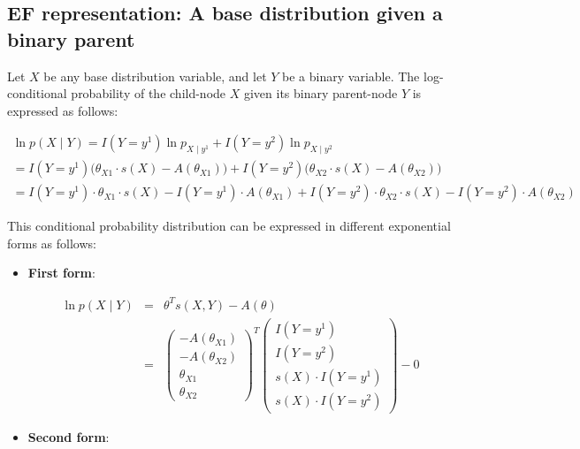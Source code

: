 \documentclass[11pt, oneside]{article}   	%
\numberwithin{figure}{section}
\numberwithin{equation}{section}
\numberwithin{table}{section}
\theoremstyle{definition}
\begin{document}
\begin{appendices}
\section{EF representation: A base distribution given a binary parent}

Let $X$ be any base distribution variable, and let $Y$ be a binary variable. The log-conditional probability of the child-node $X$ given its binary parent-node $Y$ is expressed as follows:

\begin{eqnarray*}
\ln p(X \mid Y) =  I(Y= y^1) \ln p_{X \mid y^1} + I(Y= y^2) \ln p_{X \mid y^2} ~~~~~~~~~~~~~~~~~~~~~~~~~~~~~~~~~~~~~~~~~~~~~~~~~~~~~\\
= I(Y= y^1)  \Big(\theta_{X1} \cdot s(X) - A(\theta_{X1})\Big) +  I(Y= y^2) \Big(\theta_{X2} \cdot s(X) - A(\theta_{X2})\Big) ~~~~~~~~~~~~~~~~~~~~~~~~~~~~\\
= I(Y=y^1) \cdot \theta_{X1} \cdot s(X) - I(Y=y^1) \cdot A(\theta_{X1}) +  I(Y=y^2) \cdot \theta_{X2} \cdot s(X) - I(Y=y^2) \cdot A(\theta_{X2})
\end{eqnarray*}

This conditional probability distribution can be expressed in different exponential forms as follows:

\begin{itemize}

\item \textbf{First form}:

\begin{eqnarray*}
\ln p(X \mid Y) &=& \theta^T s(X,Y) - A(\theta) \\
&=&
\begin{pmatrix}
- A(\theta_{X1}) \\
- A(\theta_{X2}) \\
\theta_{X1} \\
\theta_{X2}
\end{pmatrix}^T
\begin{pmatrix}
I(Y=y^1) \\
I(Y=y^2) \\
s(X) \cdot I(Y=y^1) \\
s(X) \cdot I(Y=y^2)
\end{pmatrix}
- 0 
\end{eqnarray*}

\item \textbf{Second form}:


\end{itemize}
\end{appendices}
\end{document}
